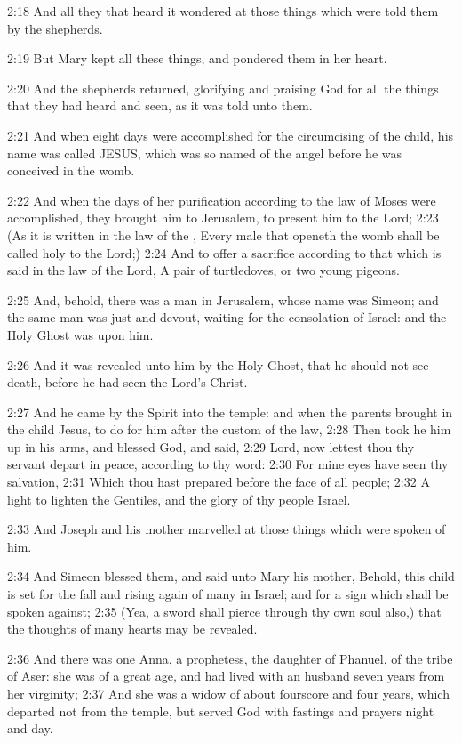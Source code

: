 2:18 And all they that heard it wondered at those things which were
told them by the shepherds.

2:19 But Mary kept all these things, and pondered them in her heart.

2:20 And the shepherds returned, glorifying and praising God for all
the things that they had heard and seen, as it was told unto them.

2:21 And when eight days were accomplished for the circumcising of the
child, his name was called JESUS, which was so named of the angel
before he was conceived in the womb.

2:22 And when the days of her purification according to the law of
Moses were accomplished, they brought him to Jerusalem, to present him
to the Lord; 2:23 (As it is written in the law of the \LORD, Every male
that openeth the womb shall be called holy to the Lord;) 2:24 And to
offer a sacrifice according to that which is said in the law of the
Lord, A pair of turtledoves, or two young pigeons.

2:25 And, behold, there was a man in Jerusalem, whose name was Simeon;
and the same man was just and devout, waiting for the consolation of
Israel: and the Holy Ghost was upon him.

2:26 And it was revealed unto him by the Holy Ghost, that he should
not see death, before he had seen the Lord's Christ.

2:27 And he came by the Spirit into the temple: and when the parents
brought in the child Jesus, to do for him after the custom of the law,
2:28 Then took he him up in his arms, and blessed God, and said, 2:29
Lord, now lettest thou thy servant depart in peace, according to thy
word: 2:30 For mine eyes have seen thy salvation, 2:31 Which thou hast
prepared before the face of all people; 2:32 A light to lighten the
Gentiles, and the glory of thy people Israel.

2:33 And Joseph and his mother marvelled at those things which were
spoken of him.

2:34 And Simeon blessed them, and said unto Mary his mother, Behold,
this child is set for the fall and rising again of many in Israel; and
for a sign which shall be spoken against; 2:35 (Yea, a sword shall
pierce through thy own soul also,) that the thoughts of many hearts
may be revealed.

2:36 And there was one Anna, a prophetess, the daughter of Phanuel, of
the tribe of Aser: she was of a great age, and had lived with an
husband seven years from her virginity; 2:37 And she was a widow of
about fourscore and four years, which departed not from the temple,
but served God with fastings and prayers night and day.

